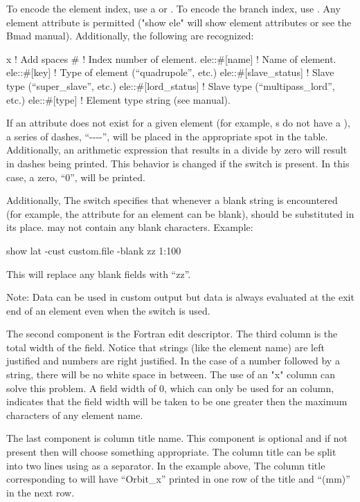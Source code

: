 {{{{{To encode the element index, use a \vn{\#} or . To encode the branch index, use
. Any element attribute is permitted ("show ele" will show element attributes or see
the Bmad manual). Additionally, the following are recognized:
\begin{example}
  x                          ! Add spaces
  #                          ! Index number of element.
  ele::#[name]                ! Name of element.
  ele::#[key]                 ! Type of element (``quadrupole'', etc.)
  ele::#[slave_status]        ! Slave type (``super_slave'', etc.)
  ele::#[lord_status]         ! Slave type (``multipass_lord'', etc.)
  ele::#[type]                ! Element type string (see \bmad manual).
\end{example}
If an attribute does not exist for a given element (for example, s do not
have a ), a series of dashes, ``-{}-{}-{}-'', will be placed in the appropriate spot
in the table.  Additionally, an arithmetic expression that results in a divide by zero
will result in dashes being printed. This behavior is changed if the  switch
is present. In this case, a zero, ``0'', will be printed.

Additionally, The  switch specifies that whenever a blank
string is encountered (for example, the  attribute for an element can be blank),
 should be substituted in its place.  may not contain any blank
characters. Example:
\begin{example}
  show lat -cust custom.file -blank zz 1:100
\end{example}
This will replace any blank fields with ``zz''.

Note: Data can be used in custom output but data is always evaluated at the exit end of an
element even when the  switch is used.

The second component is the Fortran edit descriptor. The third column is the total width
of the field. Notice that strings (like the element name) are left justified and numbers
are right justified. In the case of a number followed by a string, there will be no white
space in between. The use of an "x" column can solve this problem. A field width of 0,
which can only be used for an  column, indicates that the field width
will be taken to be one greater then the maximum characters of any element name.

The last component is column title name. This component is optional and if not present
then \tao will choose something appropriate. The column title can be split into two lines
using  as a separator.  In the example above, The column title corresponding to
 will have ``Orbit_x'' printed in one row of the title and ``(mm)'' in
the next row.

}}}}}
